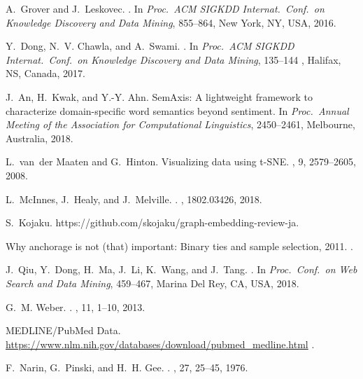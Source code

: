 \documentclass[J]{scitrans}
\begin{document}
\begin{thebibliography}{10}
A.~Grover and J.~Leskovec.
.
\newblock In {\em Proc.~ACM SIGKDD Internat.~Conf.~on Knowledge Discovery and Data Mining}, 855--864, New York,
  NY, USA, 2016.

Y.~Dong, N.~V. Chawla, and A.~Swami.
.
\newblock In {\em Proc.~ACM SIGKDD Internat.~Conf.~on Knowledge Discovery and Data Mining}, 135--144 , Halifax, NS, Canada, 2017.

J.~An, H.~Kwak, and Y.-Y. Ahn.
\newblock SemAxis: A lightweight framework to characterize domain-specific word semantics beyond sentiment.
\newblock In {\em Proc.~Annual Meeting of the Association for Computational Linguistics}, 2450--2461, Melbourne, Australia, 2018.

L.~van~der Maaten and G.~Hinton.
\newblock Visualizing data using t-SNE.
, 9, 2579--2605, 2008.

L.~McInnes, J.~Healy, and J.~Melville.
.
, 1802.03426, 2018.

S.~Kojaku.
\newblock https://github.com/skojaku/graph-embedding-review-ja.

Why anchorage is not (that) important: Binary ties and sample selection, 2011.
.

J.~Qiu, Y.~Dong, H.~Ma, J.~Li, K.~Wang, and J.~Tang.
.
\newblock In {\em Proc.~Conf.~on Web Search and Data Mining}, 459--467, Marina Del Rey, CA, USA, 2018.

G.~M. Weber.
.
, 11, 1--10, 2013.

MEDLINE/PubMed Data.
\newblock \url{https://www.nlm.nih.gov/databases/download/pubmed_medline.html}
.

F.~Narin, G.~Pinski, and H.~H. Gee.
.
,
  27, 25--45, 1976.


\end{thebibliography}
\end{document}
